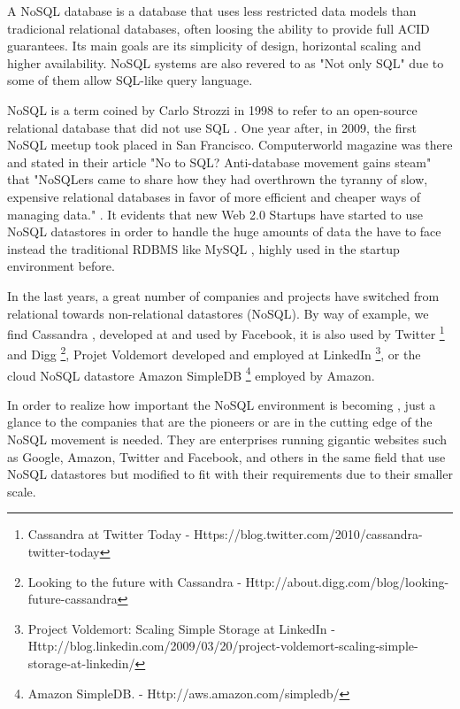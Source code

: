 \par
A NoSQL database is a database that uses less restricted data models than tradicional relational databases, often loosing the ability to provide full ACID guarantees. Its main goals are its simplicity of design, horizontal scaling and higher availability. NoSQL systems are also revered to as "Not only SQL" due to some of them allow SQL-like query language.
\par
NoSQL is a term coined by Carlo Strozzi in 1998 to refer to an open-source relational database that did not use SQL \cite{Strozzi}. One year after, in 2009, the first NoSQL meetup took placed in San Francisco. Computerworld magazine was there and stated in their article "No to SQL? Anti-database movement gains steam" that "NoSQLers came to share how they had overthrown the tyranny of slow, expensive relational databases in favor of more efficient and cheaper ways of managing data." \cite{ComputerworldNoSQL}. It evidents that new Web 2.0 Startups have started to use NoSQL datastores in order to handle the huge amounts of data the have to face instead the traditional RDBMS like MySQL \nocite{MySQL}, highly used in the startup environment before.
\par
In the last years, a great number of companies and projects have switched from relational towards non-relational datastores (NoSQL). By way of example, we find Cassandra \cite{ApacheCassandra}, developed at and used by Facebook, it is also used by Twitter \footnote{Cassandra at Twitter Today - Https://blog.twitter.com/2010/cassandra-twitter-today} and Digg \footnote{Looking to the future with Cassandra - Http://about.digg.com/blog/looking-future-cassandra}, Projet Voldemort developed and employed at LinkedIn \footnote{Project Voldemort: Scaling Simple Storage at LinkedIn - Http://blog.linkedin.com/2009/03/20/project-voldemort-scaling-simple-storage-at-linkedin/}, or the cloud NoSQL datastore Amazon SimpleDB \footnote{Amazon SimpleDB. -
Http://aws.amazon.com/simpledb/} employed by Amazon.
\par
In order to realize how important the NoSQL environment is becoming , just a glance to the companies that are the pioneers or are in the cutting edge of the NoSQL movement is needed. They are enterprises running gigantic websites such as Google, Amazon, Twitter and Facebook, and others in the same field that use NoSQL datastores but modified to fit with their requirements due to their smaller scale.
\par



